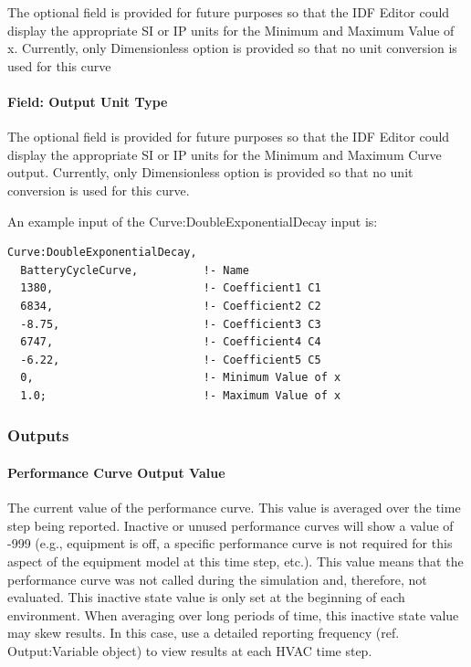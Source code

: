 The optional field is provided for future purposes so that the IDF Editor could display the appropriate SI or IP units for the Minimum and Maximum Value of x. Currently, only Dimensionless option is provided so that no unit conversion is used for this curve

\paragraph{Field: Output Unit Type}\label{field-output-unit-type-16}

The optional field is provided for future purposes so that the IDF Editor could display the appropriate SI or IP units for the Minimum and Maximum Curve output. Currently, only Dimensionless option is provided so that no unit conversion is used for this curve.

An example input of the Curve:DoubleExponentialDecay input is:

\begin{lstlisting}
Curve:DoubleExponentialDecay,
  BatteryCycleCurve,          !- Name
  1380,                       !- Coefficient1 C1
  6834,                       !- Coefficient2 C2
  -8.75,                      !- Coefficient3 C3
  6747,                       !- Coefficient4 C4
  -6.22,                      !- Coefficient5 C5
  0,                          !- Minimum Value of x
  1.0;                        !- Maximum Value of x
\end{lstlisting}

\subsubsection{Outputs}\label{outputs-021}

\paragraph{Performance Curve Output Value}\label{performance-curve-output-value}

The current value of the performance curve. This value is averaged over the time step being reported. Inactive or unused performance curves will show a value of -999 (e.g., equipment is off, a specific performance curve is not required for this aspect of the equipment model at this time step, etc.). This value means that the performance curve was not called during the simulation and, therefore, not evaluated. This inactive state value is only set at the beginning of each environment. When averaging over long periods of time, this inactive state value may skew results. In this case, use a detailed reporting frequency (ref. Output:Variable object) to view results at each HVAC time step.

